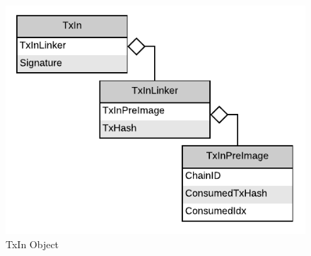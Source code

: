 \begin{figure}[H]
    \centering
    \includegraphics[scale=0.5]{figures/TxIn_Object.pdf}
    \caption{TxIn Object}
\end{figure}
